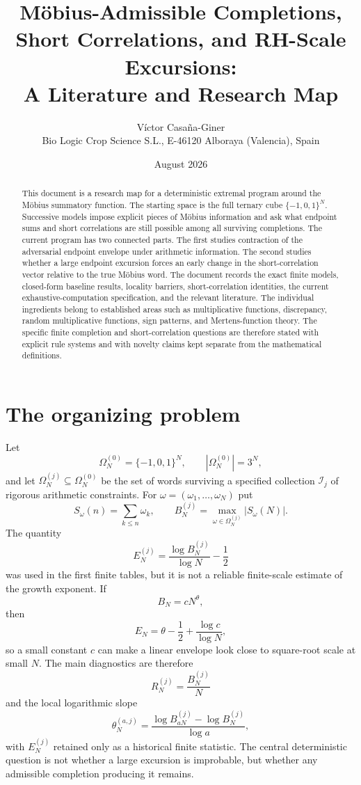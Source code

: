 \documentclass[11pt]{article}
\title{Möbius-Admissible Completions, Short Correlations, and RH-Scale Excursions:\\A Literature and Research Map}
\author{Víctor Casaña-Giner\\Bio Logic Crop Science S.L., E-46120 Alboraya (Valencia), Spain}
\date{August 2026}
\newcommand{\Om}{\Omega}
\begin{document}
\maketitle

\begin{abstract}
This document is a research map for a deterministic extremal program around the Möbius summatory function. The starting space is the full ternary cube $\{-1,0,1\}^N$. Successive models impose explicit pieces of Möbius information and ask what endpoint sums and short correlations are still possible among all surviving completions. The current program has two connected parts. The first studies contraction of the adversarial endpoint envelope under arithmetic information. The second studies whether a large endpoint excursion forces an early change in the short-correlation vector relative to the true Möbius word. The document records the exact finite models, closed-form baseline results, locality barriers, short-correlation identities, the current exhaustive-computation specification, and the relevant literature. The individual ingredients belong to established areas such as multiplicative functions, discrepancy, random multiplicative functions, sign patterns, and Mertens-function theory. The specific finite completion and short-correlation questions are therefore stated with explicit rule systems and with novelty claims kept separate from the mathematical definitions.
\end{abstract}

\section{The organizing problem}
Let
\[
 \Om_N^{(0)}=\{-1,0,1\}^N,\qquad |\Om_N^{(0)}|=3^N,
\]
and let $\Om_N^{(j)}\subseteq\Om_N^{(0)}$ be the set of words surviving a specified collection $\mathcal I_j$ of rigorous arithmetic constraints.  For $\omega=(\omega_1,\ldots,\omega_N)$ put
\[
 S_\omega(n)=\sum_{k\le n}\omega_k,
 \qquad
 B_N^{(j)}=\max_{\omega\in\Om_N^{(j)}}|S_\omega(N)|.
\]
The quantity
\[
 E_N^{(j)}=\frac{\log B_N^{(j)}}{\log N}-\frac12
\]
was used in the first finite tables, but it is not a reliable finite-scale estimate of the growth exponent. If
\[
 B_N=cN^\theta,
\]
then
\[
 E_N=\theta-\frac12+\frac{\log c}{\log N},
\]
so a small constant $c$ can make a linear envelope look close to square-root scale at small $N$. The main diagnostics are therefore
\[
 R_N^{(j)}=\frac{B_N^{(j)}}{N}
\]
and the local logarithmic slope
\[
 \theta_N^{(a,j)}=
 \frac{\log B_{aN}^{(j)}-\log B_N^{(j)}}{\log a},
\]
with $E_N^{(j)}$ retained only as a historical finite statistic. The central deterministic question is not whether a large excursion is improbable, but whether any admissible completion producing it remains.
\end{document}
